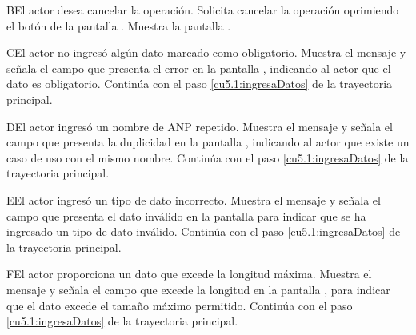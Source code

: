  \begin{UCtrayectoriaA}{B}{El actor desea cancelar la operación.}
    \UCpaso[\UCactor] Solicita cancelar la operación oprimiendo el botón  de la pantalla .
    \UCpaso[\UCsist] Muestra la pantalla .
 \end{UCtrayectoriaA}
 \begin{UCtrayectoriaA}{C}{El actor no ingresó algún dato marcado como obligatorio.}
    \UCpaso[\UCsist] Muestra el mensaje  y señala el campo que presenta el error en la pantalla 
	    , indicando al actor que el dato es obligatorio.
    \UCpaso[] Continúa con el paso \ref{cu5.1:ingresaDatos} de la trayectoria principal.
 \end{UCtrayectoriaA}
 \begin{UCtrayectoriaA}{D}{El actor ingresó un nombre de ANP repetido.}
    \UCpaso[\UCsist] Muestra el mensaje  y señala el campo que presenta la duplicidad en la pantalla 
	    , indicando al actor que existe un caso de uso con el mismo nombre.
    \UCpaso[] Continúa con el paso \ref{cu5.1:ingresaDatos} de la trayectoria principal.
 \end{UCtrayectoriaA}
 \begin{UCtrayectoriaA}{E}{El actor ingresó un tipo de dato incorrecto.}
    \UCpaso[\UCsist] Muestra el mensaje  y señala el campo que presenta el dato inválido en la 
    pantalla  para indicar que se ha ingresado un tipo de dato inválido.
    \UCpaso[] Continúa con el paso \ref{cu5.1:ingresaDatos} de la trayectoria principal.
 \end{UCtrayectoriaA}
 \begin{UCtrayectoriaA}{F}{El actor proporciona un dato que excede la longitud máxima.}
    \UCpaso[\UCsist] Muestra el mensaje  y señala el campo que excede la 
    longitud en la pantalla , para indicar que el dato excede el tamaño máximo permitido.
    \UCpaso[] Continúa con el paso \ref{cu5.1:ingresaDatos} de la trayectoria principal.
 \end{UCtrayectoriaA}
